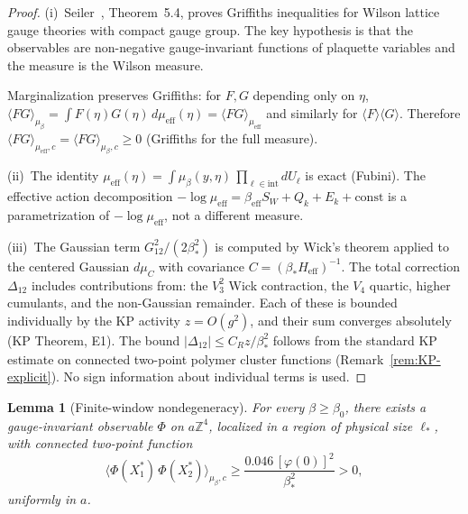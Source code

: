 \documentclass[11pt]{article}
\newtheorem{lemma}[theorem]{Lemma}
\theoremstyle{definition}
\newcommand{\Z}{\mathbb{Z}}
\begin{document}
\begin{proof}
(i)~Seiler~\cite{Seiler82}, Theorem~5.4, proves Griffiths
inequalities for Wilson lattice gauge theories with compact
gauge group.  The key hypothesis is that the observables
are non-negative gauge-invariant functions of plaquette
variables and the measure is the Wilson measure.

Marginalization preserves Griffiths: for $F,G$ depending
only on $\eta$,
$\langle FG\rangle_{\mu_\beta}
=\int F(\eta)G(\eta)\,d\mu_{\mathrm{eff}}(\eta)
=\langle FG\rangle_{\mu_{\mathrm{eff}}}$
and similarly for $\langle F\rangle\langle G\rangle$.
Therefore $\langle FG\rangle_{\mu_{\mathrm{eff}},c}
=\langle FG\rangle_{\mu_\beta,c}\ge 0$ (Griffiths for
the full measure).

(ii)~The identity $\mu_{\mathrm{eff}}(\eta)
=\int\mu_\beta(y,\eta)\,\prod_{\ell\in\mathrm{int}}dU_\ell$
is exact (Fubini).  The effective action decomposition
$-\log\mu_{\mathrm{eff}}=\beta_{\mathrm{eff}}S_W
+Q_k+E_k+\mathrm{const}$ is a parametrization of
$-\log\mu_{\mathrm{eff}}$, not a different measure.

(iii)~The Gaussian term $G_{12}^2/(2\beta_*^2)$ is
computed by Wick's theorem applied to the centered
Gaussian $d\mu_C$ with covariance
$C=(\beta_* H_{\mathrm{eff}})^{-1}$.
The total correction $\Delta_{12}$ includes contributions
from: the $V_3^2$ Wick contraction, the $V_4$ quartic,
higher cumulants, and the non-Gaussian remainder.
Each of these is bounded individually by the KP activity
$z=O(g^2)$, and their sum converges absolutely
(KP Theorem, E1).
The bound $|\Delta_{12}|\le C_R z/\beta_*^2$ follows
from the standard KP estimate on connected two-point
polymer cluster functions
(Remark~\ref{rem:KP-explicit}).
No sign information about individual terms is used.
\end{proof}

\begin{lemma}[Finite-window nondegeneracy]\label{lem:nontriviality}
For every $\beta\ge\beta_0$, there exists a gauge-invariant
observable $\Phi$ on $a\Z^4$, localized in a region of
physical size $\ell_*$, with connected two-point function
\begin{equation}\label{eq:nontriviality-lemma}
\langle\Phi(X_1^*)\,\Phi(X_2^*)\rangle_{\mu_\beta,c}
\ge\frac{0.046\,[\varphi(0)]^2}{\beta_*^2}>0,
\end{equation}
uniformly in $a$.
\end{lemma}
\end{document}
